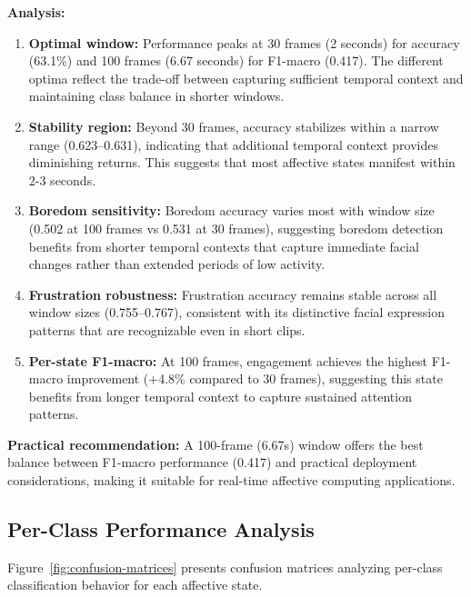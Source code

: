\textbf{Analysis:}
\begin{enumerate}
    \item \textbf{Optimal window:} Performance peaks at 30 frames (2 seconds) for accuracy (63.1\%) and 100 frames (6.67 seconds) for F1-macro (0.417). The different optima reflect the trade-off between capturing sufficient temporal context and maintaining class balance in shorter windows.

    \item \textbf{Stability region:} Beyond 30 frames, accuracy stabilizes within a narrow range (0.623--0.631), indicating that additional temporal context provides diminishing returns. This suggests that most affective states manifest within 2-3 seconds.

    \item \textbf{Boredom sensitivity:} Boredom accuracy varies most with window size (0.502 at 100 frames vs 0.531 at 30 frames), suggesting boredom detection benefits from shorter temporal contexts that capture immediate facial changes rather than extended periods of low activity.

    \item \textbf{Frustration robustness:} Frustration accuracy remains stable across all window sizes (0.755--0.767), consistent with its distinctive facial expression patterns that are recognizable even in short clips.
    
    \item \textbf{Per-state F1-macro:} At 100 frames, engagement achieves the highest F1-macro improvement (+4.8\% compared to 30 frames), suggesting this state benefits from longer temporal context to capture sustained attention patterns.
\end{enumerate}

\textbf{Practical recommendation:} A 100-frame (6.67s) window offers the best balance between F1-macro performance (0.417) and practical deployment considerations, making it suitable for real-time affective computing applications.

\subsection{Per-Class Performance Analysis}
\label{sec:per-class}

Figure~\ref{fig:confusion-matrices} presents confusion matrices analyzing per-class classification behavior for each affective state.

